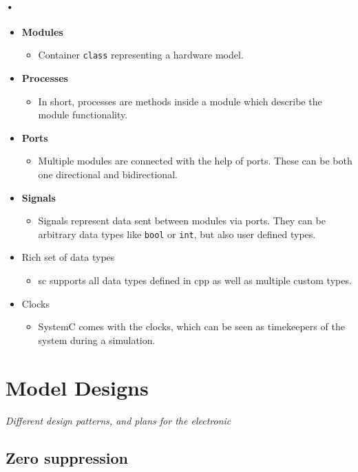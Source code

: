 \documentclass[a4paper]{report}
\newcommand{\codeword}[1]{\texttt{#1}}
\begin{document}
\paragraph{•}
\begin{itemize}
\item \textbf{Modules}
	\begin{itemize}
		\item Container \codeword{class} representing a hardware model.
	\end{itemize}
\item \textbf{Processes}
	\begin{itemize}
		\item In short, processes are methods inside a module which describe the module functionality.
	\end{itemize}
\item \textbf{Ports}
	\begin{itemize}
		\item Multiple modules are connected with the help of ports. These can be both one directional and bidirectional.
	\end{itemize}
\item \textbf{Signals}
	\begin{itemize}
		\item Signals represent data sent between modules via ports. They can be arbitrary data types like \codeword{bool} or \codeword{int}, but also user defined types.
	\end{itemize}
\item Rich set of data types
	\begin{itemize}
		\item \gls{sc} supports all data types defined in \gls{cpp} as well as multiple custom types. 
	\end{itemize}
\item Clocks
	\begin{itemize}
		\item SystemC comes with the clocks, which can be seen as timekeepers of the system during a simulation.
	\end{itemize}
\end{itemize}

\section{Model Designs}
\textit{Different design patterns, and plans for the electronic}

\subsection{Zero suppression}
\end{document}
